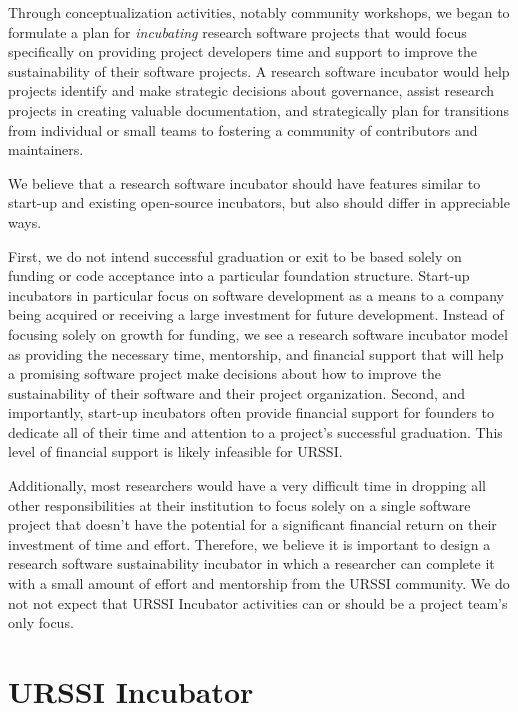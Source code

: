 \documentclass[
]{book}
\begin{document}
Through conceptualization activities, notably community workshops, we began to formulate a plan for \emph{incubating} research software projects that would focus specifically on providing project developers time and support to improve the sustainability of their software projects.
A research software incubator would help projects identify and make strategic decisions about governance, assist research projects in creating valuable documentation, and strategically plan for transitions from individual or small teams to fostering a community of contributors and maintainers.

We believe that a research software incubator should have features similar to start-up and existing open-source incubators, but also should differ in appreciable ways.

First, we do not intend successful graduation or exit to be based solely on funding or code acceptance into a particular foundation structure.
Start-up incubators in particular focus on software development as a means to a company being acquired or receiving a large investment for future development.
Instead of focusing solely on growth for funding, we see a research software incubator model as providing the necessary time, mentorship, and financial support that will help a promising software project make decisions about how to improve the sustainability of their software and their project organization.
Second, and importantly, start-up incubators often provide financial support for founders to dedicate all of their time and attention to a project's successful graduation. This level of financial support is likely infeasible for URSSI.

Additionally, most researchers would have a very difficult time in dropping all other responsibilities at their institution to focus solely on a single software project that doesn't have the potential for a significant financial return on their investment of time and effort.
Therefore, we believe it is important to design a research software sustainability incubator in which a researcher can complete it with a small amount of effort and mentorship from the URSSI community.
We do not not expect that URSSI Incubator activities can or should be a project team's only focus.

\hypertarget{urssi-incubator}{%
\section{URSSI Incubator}\label{urssi-incubator}}
\end{document}
